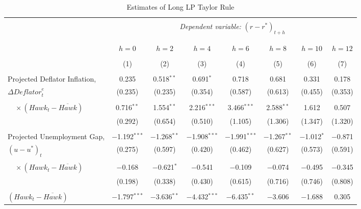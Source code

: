 \documentclass[11pt]{article}
\begin{document}
  \begin{table}[!htbp] \centering \scriptsize
    \begin{threeparttable}
    \caption{Estimates of Long LP Taylor Rule} 
    \label{tab:LP_long_full} 
  \begin{tabular}{@{\extracolsep{3pt}}lccccccc} 
  \\[-1.8ex]\hline 
  \hline \\[-1.8ex] 
  & \multicolumn{7}{c}{\textit{Dependent variable:} $\left(r-r^*\right)_{t+h}$} \\ \\[-1.8ex] 
  \cline{2-8} 
  \\[-1.8ex] & $h=0$ & $h=2$ & $h=4$ & $h=6$ & $h=8$ & $h=10$ & $h=12$ \\ 
  \\[-1.8ex] & (1) & (2) & (3) & (4) & (5) & (6) & (7)\\ 
  \hline \\[-1.8ex] 
  Projected Deflator Inflation,  & 0.235 & 0.518$^{**}$ & 0.691$^{*}$ & 0.718 & 0.681 & 0.331 & 0.178 \\ 
  $\Delta\mathit{Deflator}_t^e$ & (0.235) & (0.235) & (0.354) & (0.587) & (0.613) & (0.455) & (0.353) \\ 
    & & & & & & & \\ 
   $\quad \times \left(\mathit{Hawk}_t-\overline{\mathit{Hawk}}\right)$ & 0.716$^{**}$ & 1.554$^{**}$ & 2.216$^{***}$ & 3.466$^{***}$ & 2.588$^{**}$ & 1.612 & 0.507 \\ 
   & (0.292) & (0.654) & (0.510) & (1.105) & (1.306) & (1.347) & (1.320) \\ 
   & & & & & & & \\ 
   Projected Unemployment Gap, &  $-$1.192$^{***}$ & $-$1.268$^{**}$ & $-$1.908$^{***}$ & $-$1.991$^{***}$ & $-$1.267$^{**}$ & $-$1.012$^{*}$ & $-$0.871 \\ 
   $\left(u-u^*\right)_t$  & (0.275) & (0.597) & (0.420) & (0.462) & (0.627) & (0.573) & (0.591) \\ 
   & & & & & & & \\ 
    $\quad \times \left(\mathit{Hawk}_t-\overline{\mathit{Hawk}}\right)$ & $-$0.168 & $-$0.621$^{*}$ & $-$0.541 & $-$0.109 & $-$0.074 & $-$0.495 & $-$0.345 \\ 
    & (0.198) & (0.338) & (0.430) & (0.615) & (0.716) & (0.746) & (0.808) \\ 
    & & & & & & & \\ 
    $\left(\mathit{Hawk}_t-\overline{\mathit{Hawk}}\right)$ & $-$1.797$^{***}$ & $-$3.636$^{**}$ & $-$4.432$^{***}$ & $-$6.435$^{**}$ & $-$3.606 & $-$1.688 & 0.305 \\ 

\end{tabular}
\end{threeparttable}
\end{table}
\end{document}
